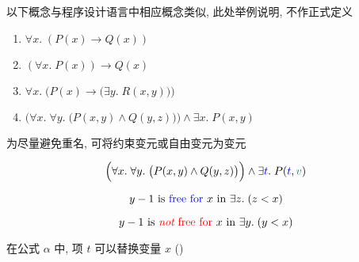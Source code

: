 \begin{frame}{}
  \begin{center}
    以下概念与程序设计语言中相应概念类似, 此处举例说明, 不作正式定义
  \end{center}

  \begin{definition}
    \begin{enumerate}[(1)]
      \setlength{\itemsep}{6pt}
      \item $\forall x.\; (P(x) \to Q(x))$
      \item $(\forall x.\; P(x)) \to Q(x)$
      \item $\forall x.\; \Big(P(x) \to \big(\exists y.\; R(x, y)\big)\Big)$
      \item $\Big(\forall x.\; \forall y.\; \big(P(x, y) \land Q(y, z)\big)\Big) \land \exists x.\; P(x, y)$
    \end{enumerate}
  \end{definition}

  \pause
  \vspace{0.30cm}
  \begin{definition}[改名 (Rename)]
    为尽量避免重名, 可将约束变元或自由变元为变元
  \end{definition}

  \[
    \Big(\forall x.\; \forall y.\; \big(P(x, y) \land Q(y, z)\big)\Big)
      \land \exists \textcolor{blue}{t}.\; P(\textcolor{blue}{t}, \textcolor{teal}{v})
  \]
\end{frame}

\begin{frame}{}
  \begin{definition}
    \[
      y - 1 \text{ is \textcolor{blue}{free for} } x \text{ in } \exists z.\; (z < x)
    \]

    \[
      y - 1 \text{ is \textcolor{red}{{\it not} free for} } x \text{ in } \exists y.\; (y < x)
    \]
  \end{definition}

  \vspace{0.50cm}
  \begin{center}
    在公式 $\alpha$ 中, 项 $t$ 可以替换变量 $x$ (\blue{$\alpha[t/x]$})
  \end{center}
\end{frame}

